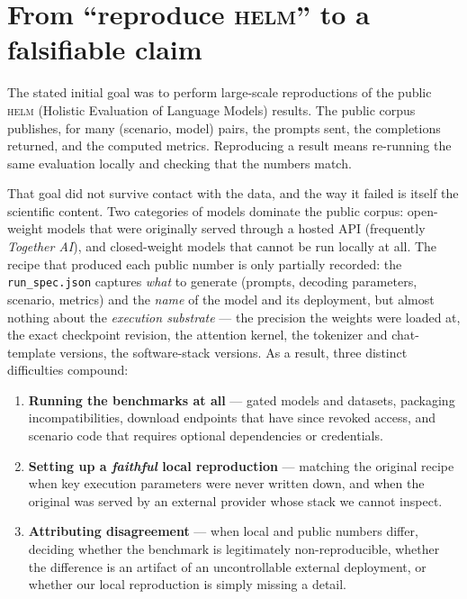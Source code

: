 \documentclass[11pt]{report}
\newcommand{\file}[1]{\texttt{#1}}
\begin{document}
\section{From ``reproduce \textsc{helm}'' to a falsifiable claim}

The stated initial goal was to perform large-scale reproductions of the public
\textsc{helm} (Holistic Evaluation of Language Models) results. The public
corpus publishes, for many (scenario, model) pairs, the prompts sent, the
completions returned, and the computed metrics. Reproducing a result means
re-running the same evaluation locally and checking that the numbers match.

That goal did not survive contact with the data, and the way it failed is itself
the scientific content. Two categories of models dominate the public corpus:
open-weight models that were originally served through a hosted API (frequently
\emph{Together AI}), and closed-weight models that cannot be run locally at all.
The recipe that produced each public number is only partially recorded: the
\file{run\_spec.json} captures \emph{what} to generate (prompts, decoding
parameters, scenario, metrics) and the \emph{name} of the model and its
deployment, but almost nothing about the \emph{execution substrate} --- the
precision the weights were loaded at, the exact checkpoint revision, the attention
kernel, the tokenizer and chat-template versions, the software-stack versions. As
a result, three distinct difficulties compound:

\begin{enumerate}[nosep]
  \item \textbf{Running the benchmarks at all} --- gated models and datasets,
        packaging incompatibilities, download endpoints that have since revoked
        access, and scenario code that requires optional dependencies or
        credentials.
  \item \textbf{Setting up a \emph{faithful} local reproduction} --- matching the
        original recipe when key execution parameters were never written down, and
        when the original was served by an external provider whose stack we cannot
        inspect.
  \item \textbf{Attributing disagreement} --- when local and public numbers
        differ, deciding whether the benchmark is legitimately non-reproducible,
        whether the difference is an artifact of an uncontrollable external
        deployment, or whether our local reproduction is simply missing a detail.
\end{enumerate}
\end{document}
